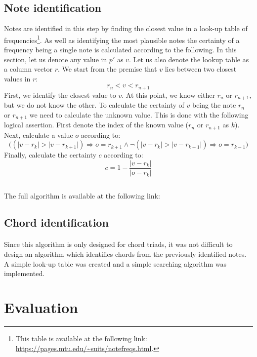 \documentclass{article}
\providecommand{\abs}[1]{\lvert#1\rvert}
\begin{document}
\subsection{Note identification}
Notes are identified in this step by finding the closest value in a look-up 
table of frequencies\footnote{This table is available at the following link: 
\url{https://pages.mtu.edu/~suits/notefreqs.html}.}. As well as identifying 
the most plausible notes the certainty of a frequency being a single note is 
calculated according to the following. In this section, let us denote any 
value in $p'$ as $v$. Let us also denote the lookup table as a column vector 
$r$. We start from the premise that $v$ lies between two closest values in $r$:
$$r_n < v < r_{n+1}$$
First, we identify the closest value to $v$. At this point, we know either 
$r_n$ or $r_{n+1}$, but we do not know the other. To calculate the certainty 
of $v$ being the note $r_n$ or $r_{n+1}$ we need to calculate the unknown 
value. This is done with the following logical assertion. First denote the 
index of the known value ($r_n$ or $r_{n+1}$ as $k$). Next, calculate a value 
$o$ according to:
$$\Big((\abs{v - r_k} > \abs{v - r_{k+1}}) \Rightarrow o = r_{k+1} \land 
\neg (\abs{v - r_k} > \abs{v - r_{k+1}}) \Rightarrow o = r_{k-1}\Big)$$
Finally, calculate the certainty $c$ according to:
$$c = 1 - \frac{\abs{v - r_k}}{\abs{o - r_k}}$$

\subsection*{}
\paragraph*{}
The full algorithm is available at the following link: \url{}

\subsection{Chord identification}
\paragraph*{}
Since this algorithm is only designed for chord triads, it was not difficult 
to design an algorithm which identifies chords from the previously identified 
notes. A simple look-up table was created and a simple searching algorithm was 
implemented.

\section{Evaluation}
\end{document}
